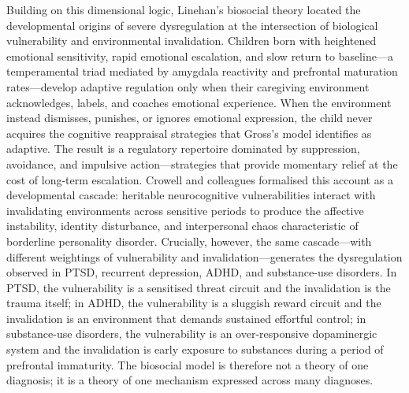 Building on this dimensional logic, Linehan's biosocial theory located the
developmental origins of severe dysregulation at the intersection of
biological vulnerability and environmental invalidation.\cite{crowell2009}  Children
born with heightened emotional sensitivity, rapid emotional escalation, and
slow return to baseline---a temperamental triad mediated by amygdala
reactivity and prefrontal maturation rates---develop adaptive regulation
only when their caregiving environment acknowledges, labels, and coaches
emotional experience.  When the environment instead dismisses, punishes, or
ignores emotional expression, the child never acquires the cognitive
reappraisal strategies that Gross's model identifies as adaptive.  The
result is a regulatory repertoire dominated by suppression, avoidance, and
impulsive action---strategies that provide momentary relief at the cost of
long-term escalation.  Crowell and colleagues formalised this account as a
developmental cascade: heritable neurocognitive vulnerabilities interact
with invalidating environments across sensitive periods to produce the
affective instability, identity disturbance, and interpersonal chaos
characteristic of borderline personality disorder.\cite{crowell2009}  Crucially,
however, the same cascade---with different weightings of vulnerability and
invalidation---generates the dysregulation observed in PTSD, recurrent
depression, ADHD, and substance-use disorders.  In PTSD, the vulnerability
is a sensitised threat circuit and the invalidation is the trauma itself;
in ADHD, the vulnerability is a sluggish reward circuit and the
invalidation is an environment that demands sustained effortful control; in
substance-use disorders, the vulnerability is an over-responsive
dopaminergic system and the invalidation is early exposure to substances
during a period of prefrontal immaturity.  The biosocial model is therefore
not a theory of one diagnosis; it is a theory of one mechanism expressed
across many diagnoses.


